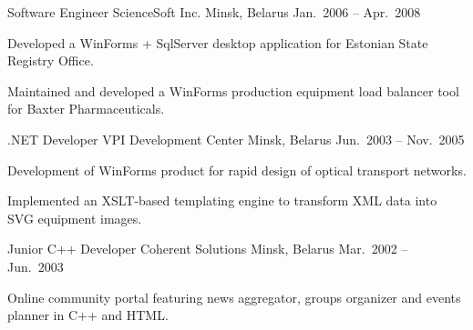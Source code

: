 \begin{cventries}
  \cventry
    {Software Engineer} %
    {ScienceSoft Inc.} %
    {Minsk, Belarus} %
    {Jan.\ 2006 -- Apr.\ 2008} %
    {
      \begin{cvitems} %
        \item {Developed a WinForms + SqlServer desktop application for Estonian State Registry Office.}
        \item {Maintained and developed a WinForms production equipment load balancer tool for Baxter Pharmaceuticals.}
      \end{cvitems}
    }

  \cventry
    {.NET Developer} %
    {VPI Development Center} %
    {Minsk, Belarus} %
    {Jun.\ 2003 -- Nov.\ 2005} %
    {
      \begin{cvitems} %
        \item {Development of WinForms product for rapid design of optical transport networks.}
        \item {Implemented an XSLT-based templating engine to transform XML data into SVG equipment images.}
      \end{cvitems}
    }

  \cventry
    {Junior C++ Developer} %
    {Coherent Solutions} %
    {Minsk, Belarus} %
    {Mar.\ 2002 -- Jun.\ 2003} %
    {
      \begin{cvitems} %
        \item {Online community portal featuring news aggregator, groups organizer and events planner in C++ and HTML.}
      \end{cvitems}
    }

\end{cventries}
